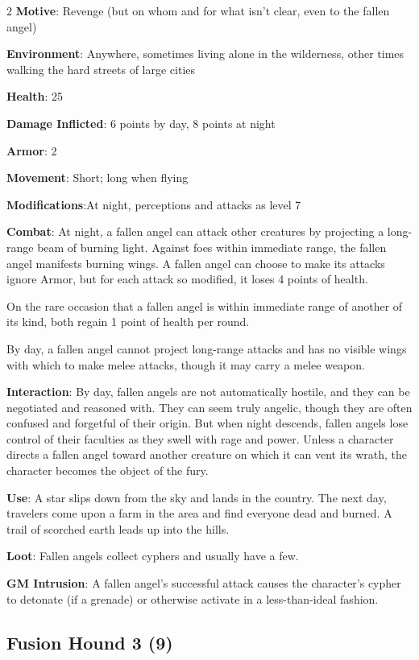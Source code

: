 \begin{multicols}{2}
\textbf{Motive}: Revenge (but on whom and for what isn’t clear, even to the fallen angel)

\textbf{Environment}: Anywhere, sometimes living alone in the wilderness, other times walking the hard streets of large cities

\textbf{Health}: 25

\textbf{Damage Inflicted}: 6 points by day, 8 points at night

\textbf{Armor}: 2

\textbf{Movement}: Short; long when flying

\textbf{Modifications}:At night, perceptions and attacks as level 7

\textbf{Combat}: At night, a fallen angel can attack other creatures by projecting a long-range beam of burning light. Against foes within immediate range, the fallen angel manifests burning wings. A fallen angel can choose to make its attacks ignore Armor, but for each attack so modified, it loses 4 points of health.

On the rare occasion that a fallen angel is within immediate range of another of its kind, both regain 1 point of health per round.

By day, a fallen angel cannot project long-range attacks and has no visible wings with which to make melee attacks, though it may carry a melee weapon.

\textbf{Interaction}: By day, fallen angels are not automatically hostile, and they can be negotiated and reasoned with. They can seem truly angelic, though they are often confused and forgetful of their origin. But when night descends, fallen angels lose control of their faculties as they swell with rage and power. Unless a character directs a fallen angel toward another creature on which it can vent its wrath, the character becomes the object of the fury.

\textbf{Use}: A star slips down from the sky and lands in the country. The next day, travelers come upon a farm in the area and find everyone dead and burned. A trail of scorched earth leads up into the hills.

\textbf{Loot}: Fallen angels collect cyphers and usually have a few.

\textbf{GM Intrusion}: A fallen angel’s successful attack causes the character’s cypher to detonate (if a grenade) or otherwise activate in a less-than-ideal fashion.

\subsection{Fusion Hound	3 (9)}


\end{multicols}
